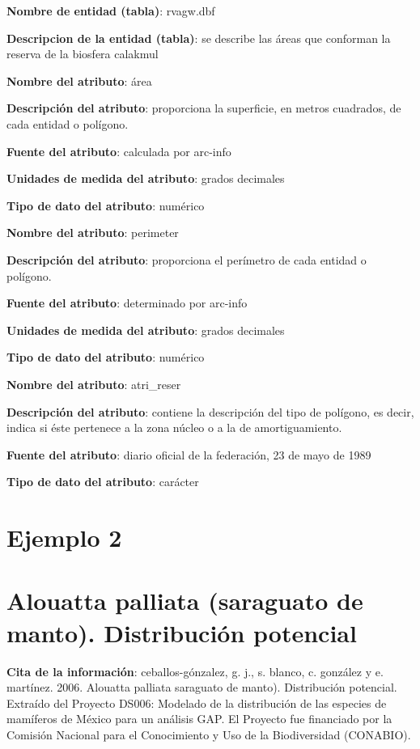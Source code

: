 \documentclass[twoside]{book}
\begin{document}
{\textbf{Nombre de entidad (tabla)}: rvagw.dbf

\textbf{Descripcion de la entidad (tabla)}: se describe las áreas que conforman la reserva de la biosfera calakmul

\textbf{Nombre del atributo}: área

\textbf{Descripción del atributo}: proporciona la superficie, en metros cuadrados, de cada entidad o polígono.

\textbf{Fuente del atributo}: calculada por arc-info

\textbf{Unidades de medida del atributo}: grados decimales

\textbf{Tipo de dato del atributo}: numérico

\textbf{Nombre del atributo}: perimeter

\textbf{Descripción del atributo}: proporciona el perímetro de cada entidad o polígono.

\textbf{Fuente del atributo}: determinado por arc-info

\textbf{Unidades de medida del atributo}: grados decimales

\textbf{Tipo de dato del atributo}: numérico

\textbf{Nombre del atributo}: atri\_reser

\textbf{Descripción del atributo}: contiene la descripción del tipo de polígono, es decir, indica si éste pertenece a la zona núcleo o a la de amortiguamiento.

\textbf{Fuente del atributo}: diario oficial de la federación, 23 de mayo de 1989


\textbf{Tipo de dato del atributo}: carácter

\section*{Ejemplo 2}
\section*{Alouatta palliata (saraguato de manto). Distribución potencial}


\textbf{Cita de la información}: ceballos-gónzalez, g. j., s. blanco, c. gonzález y e. martínez. 2006. Alouatta palliata saraguato de manto). Distribución potencial. Extraído del Proyecto DS006: Modelado de la distribución de las especies de mamíferos de México para un análisis GAP. El Proyecto fue financiado por la Comisión Nacional para el Conocimiento y Uso de la Biodiversidad (CONABIO).

}
\end{document}
